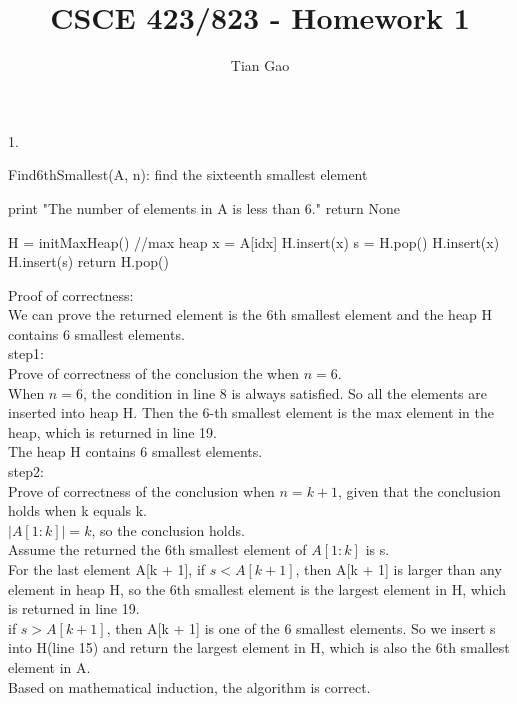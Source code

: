 \documentclass{article}
\title{CSCE 423/823 - Homework 1}
\author{Tian Gao}
\begin{document}
\maketitle

1.\\
\begin{algorithm}[H]
	\caption{\newline Find6thSmallest(A, n): find the sixteenth smallest element}
	
	{
		print "The number of elements in A is less than 6."\;
		return None\;
	}
	            
	H = initMaxHeap() //max heap \;
	{
		x = A[idx]\;
		{
			H.insert(x)\;
		}
		{
			s = H.pop()\;
			{
				H.insert(x)\;
			}
			{
				H.insert(s)\;
			}
		}
	}
	return H.pop()\;
\end{algorithm}

Proof of correctness:\\
We can prove the returned element is the 6th smallest element and the heap H contains 6 smallest elements.\\
step1:\\
Prove of correctness of the conclusion the when $n=6$.\\
When $n=6$, the condition in line 8 is always satisfied. So all the elements are inserted into heap H. 
Then the 6-th smallest element is the max element in the heap, which is returned in line 19.\\
The heap H contains 6 smallest elements.\\
step2:\\
Prove of correctness of the conclusion when $n=k+1$, given that the conclusion holds when k equals k.\\
$|A[1: k]| = k$, so the conclusion holds.\\
Assume the returned the 6th smallest element of $A[1: k]$ is s.\\
For the last element A[k + 1], if $s < A[k + 1]$, then A[k + 1] is larger than any element in heap H, so the 6th smallest element is the largest element in H,
which is returned in line 19.\\
if $s > A[k + 1]$, then A[k + 1] is one of the 6 smallest elements. So we insert s into H(line 15) and return the largest element in H, which is also the 6th smallest element in A.\\
Based on mathematical induction, the algorithm is correct.\\
\end{document}
